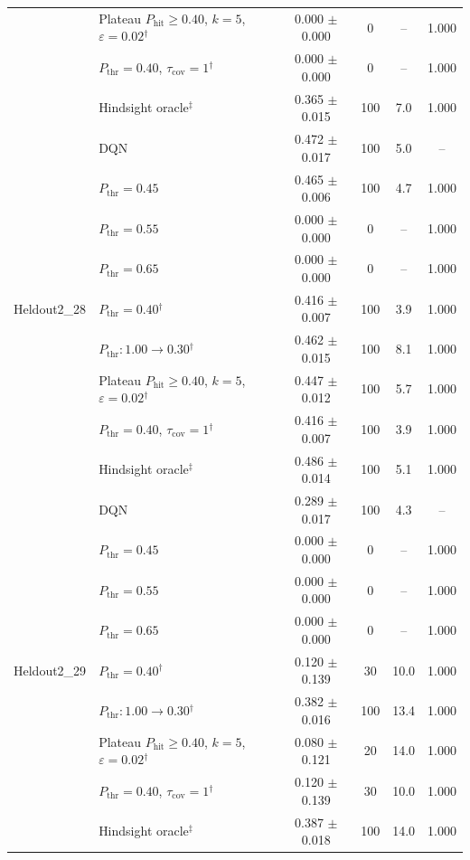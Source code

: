\begin{table}[htbp]
\begin{tabular}{llcccc}
 & Plateau $P_{\mathrm{hit}}\geq0.40$, $k=5$, $\varepsilon=0.02$$^{\dagger}$ & 0.000 $\pm$ 0.000 & 0 & -- & 1.000 \\
 & $P_{\mathrm{thr}}=0.40$, $\tau_{\mathrm{cov}}=1$$^{\dagger}$ & 0.000 $\pm$ 0.000 & 0 & -- & 1.000 \\
 & Hindsight oracle$^{\ddagger}$ & 0.365 $\pm$ 0.015 & 100 & 7.0 & 1.000 \\
\midrule
\multirow{9}{*}{Heldout2\_28} & DQN & 0.472 $\pm$ 0.017 & 100 & 5.0 & -- \\
 & $P_{\mathrm{thr}}=0.45$ & 0.465 $\pm$ 0.006 & 100 & 4.7 & 1.000 \\
 & $P_{\mathrm{thr}}=0.55$ & 0.000 $\pm$ 0.000 & 0 & -- & 1.000 \\
 & $P_{\mathrm{thr}}=0.65$ & 0.000 $\pm$ 0.000 & 0 & -- & 1.000 \\
 & $P_{\mathrm{thr}}=0.40$$^{\dagger}$ & 0.416 $\pm$ 0.007 & 100 & 3.9 & 1.000 \\
 & $P_{\mathrm{thr}}: 1.00 \to 0.30$$^{\dagger}$ & 0.462 $\pm$ 0.015 & 100 & 8.1 & 1.000 \\
 & Plateau $P_{\mathrm{hit}}\geq0.40$, $k=5$, $\varepsilon=0.02$$^{\dagger}$ & 0.447 $\pm$ 0.012 & 100 & 5.7 & 1.000 \\
 & $P_{\mathrm{thr}}=0.40$, $\tau_{\mathrm{cov}}=1$$^{\dagger}$ & 0.416 $\pm$ 0.007 & 100 & 3.9 & 1.000 \\
 & Hindsight oracle$^{\ddagger}$ & 0.486 $\pm$ 0.014 & 100 & 5.1 & 1.000 \\
\midrule
\multirow{9}{*}{Heldout2\_29} & DQN & 0.289 $\pm$ 0.017 & 100 & 4.3 & -- \\
 & $P_{\mathrm{thr}}=0.45$ & 0.000 $\pm$ 0.000 & 0 & -- & 1.000 \\
 & $P_{\mathrm{thr}}=0.55$ & 0.000 $\pm$ 0.000 & 0 & -- & 1.000 \\
 & $P_{\mathrm{thr}}=0.65$ & 0.000 $\pm$ 0.000 & 0 & -- & 1.000 \\
 & $P_{\mathrm{thr}}=0.40$$^{\dagger}$ & 0.120 $\pm$ 0.139 & 30 & 10.0 & 1.000 \\
 & $P_{\mathrm{thr}}: 1.00 \to 0.30$$^{\dagger}$ & 0.382 $\pm$ 0.016 & 100 & 13.4 & 1.000 \\
 & Plateau $P_{\mathrm{hit}}\geq0.40$, $k=5$, $\varepsilon=0.02$$^{\dagger}$ & 0.080 $\pm$ 0.121 & 20 & 14.0 & 1.000 \\
 & $P_{\mathrm{thr}}=0.40$, $\tau_{\mathrm{cov}}=1$$^{\dagger}$ & 0.120 $\pm$ 0.139 & 30 & 10.0 & 1.000 \\
 & Hindsight oracle$^{\ddagger}$ & 0.387 $\pm$ 0.018 & 100 & 14.0 & 1.000 \\

\end{tabular}
\end{table}

